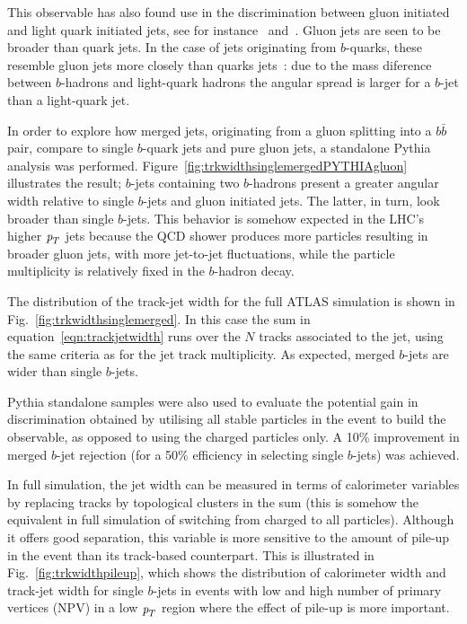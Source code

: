 This observable has also found use in the discrimination between gluon initiated and light quark initiated jets, see for instance~\cite{PhysRevLett.107.172001} and~\cite{ATLAS-CONF-2011-053}. Gluon jets are seen to be broader than quark jets. In the case of jets originating from $b$-quarks, these resemble gluon jets more closely than quarks jets~\cite{Buskulic1996353}: due to the %
mass diference between $b$-hadrons and light-quark hadrons the angular spread is larger for a $b$-jet than a light-quark jet. 

In order to explore how merged jets, originating from a gluon splitting into a $b\bar{b}$ pair, compare to single $b$-quark jets and pure gluon jets,  a standalone {\sc Pythia} analysis was performed.  Figure~\ref{fig:trkwidthsinglemergedPYTHIAgluon} illustrates the result; $b$-jets containing two $b$-hadrons present a greater angular width relative to single $b$-jets and gluon initiated jets. The latter, in turn, look broader than single $b$-jets. This behavior is somehow expected in the LHC's higher ${\emph{p}_{T}}$ jets because the QCD shower produces more particles resulting in broader gluon jets, with more jet-to-jet fluctuations, while the particle multiplicity is relatively fixed in the $b$-hadron decay.

The distribution of the track-jet width for the full ATLAS simulation is shown in Fig.~\ref{fig:trkwidthsinglemerged}. In this case %
the sum in equation~\ref{eqn:trackjetwidth} runs over the $N$ tracks associated to the jet, using the same criteria as for the jet track multiplicity. As expected, merged $b$-jets are wider than single $b$-jets. 

{\sc Pythia} standalone samples were also used to evaluate the potential gain in discrimination obtained by utilising all stable particles in the event to build the observable, as opposed to using the charged particles only.  A 10\% %
 improvement in merged $b$-jet rejection (for a 50\% efficiency in selecting single $b$-jets) was achieved.

In full simulation, the jet width can be measured in terms of calorimeter variables by replacing tracks by topological clusters in the sum (this is somehow the equivalent in full simulation of switching from charged to all particles).  Although it offers good separation, this variable is more sensitive to the amount of pile-up in the event than its track-based counterpart. This is illustrated in Fig.~\ref{fig:trkwidthpileup}, which shows the distribution of calorimeter width and track-jet width for single $b$-jets in events with low and high number of primary vertices (NPV) in a low ${\emph{p}_{T}}$ region where the effect of pile-up is more important. 

